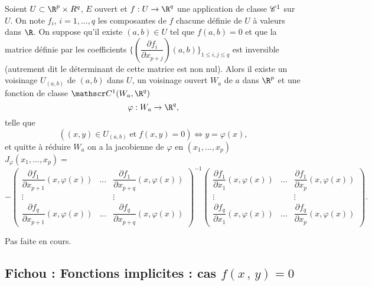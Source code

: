 \documentclass[12pt, class=report,crop=false]{standalone}
\begin{document}
{{\begin{proposition}  
\textcolor[rgb]{0.44,0.00,0.87}{ 
Soient $U \subset \R^p \times R^q$, $E$ ouvert et $f:U \rightarrow \R^q$ une application
de classe $\mathscr{C}^1$ sur $U$. On note $f_i$, $i=1,...,q$ les composantes de $f$ chacune définie de $U$ à valeurs dans $\R$. On suppose qu'il existe $(a,b) \in U$ tel que  
$f(a,b)=0$ et que la matrice définie par les coefficients
$\lbrace(\dfrac{\partial f_i}{\partial x_{p+j}})(a,b)\rbrace_{1 \leq i,j \leq q} $ est inversible (autrement dit le déterminant de cette matrice
est non nul).
Alors il existe un voisinage $U_{(a,b)}$ de $(a,b)$ dans $U$, un voisinage
ouvert $W_a$ de $a$ dans $\R^p$ et une fonction de classe $\co^1 (W_a, \R^q)$
\begin{equation*}
\varphi: W_a \rightarrow \R^q,
\end{equation*}
telle que
\begin{equation*}
((x,y) \in U_{(a,b)} \;\mathrm{et\;} f(x,y)=0)\Leftrightarrow y=\varphi(x),
\end{equation*}
et quitte à réduire $W_a$ on a la jacobienne de $\varphi$ en $(x_1,...,x_p)$\\
$J_{\varphi}(x_1,...,x_p)= $
\begin{equation*}
-\left(
\begin{array}{lll}
\dfrac{\partial f_1}{\partial x_{p+1}}(x,\varphi(x))&...&\dfrac{\partial f_1}{\partial x_{p+q}}(x,\varphi(x))\\
\vdots & &\vdots\\
\dfrac{\partial f_q}{\partial x_{p+1}}(x,\varphi(x))&...&\dfrac{\partial f_q}{\partial x_{p+q}}(x,\varphi(x))
 \end{array}
\right)^{-1}
\left(
\begin{array}{lll}
\dfrac{\partial f_1}{\partial x_{1}}(x,\varphi(x))&...&\dfrac{\partial f_1}{\partial x_{p}}(x,\varphi(x))\\
\vdots & &\vdots\\
\dfrac{\partial f_q}{\partial x_{1}}(x,\varphi(x))&...&\dfrac{\partial f_q}{\partial x_{p}}(x,\varphi(x))
 \end{array}
\right).
\end{equation*}
 }
\end{proposition}

 Pas faite en cours.

\subsection{Fichou : Fonctions implicites : cas $f(x\,,\,y) = 0$}
 

}}
\end{document}
